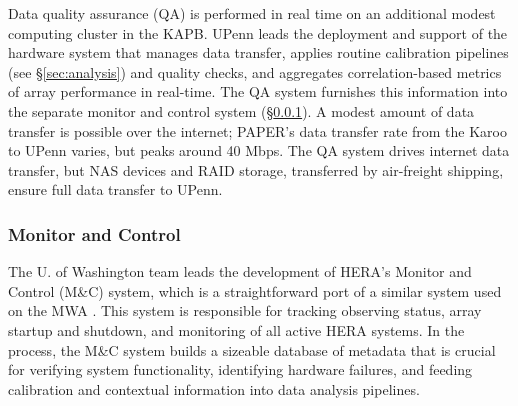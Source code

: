 \documentclass[preprint]{aastex}
\newcommand{\compress}{\vspace{-0.3in}}
\begin{document}
Data quality assurance (QA) is performed in real time on an additional modest 
computing cluster in the
KAPB.  UPenn leads the deployment and support of the hardware system that
manages data transfer, applies routine calibration pipelines (see \S\ref{sec:analysis}) and quality
checks, and aggregates correlation-based metrics of array performance in real-time.  The QA system
furnishes this information into the separate monitor and control system (\S\ref{sec:monitor}).
A modest amount of data transfer is possible over the internet; PAPER's data transfer rate from the Karoo
to UPenn varies, but peaks around 40 Mbps.  The QA system drives internet data transfer, but
NAS devices and RAID storage, transferred by air-freight shipping, ensure full data transfer to UPenn.




\compress
\subsubsection{Monitor and Control}
\label{sec:monitor}

The U. of Washington team leads the development of HERA's Monitor and Control (M\&C) system,
which is a straightforward port of a similar system used on the MWA \citep{tingay_et_al2013}.
This system is
responsible for tracking observing status, array startup and shutdown, and
monitoring of all active HERA systems. In the process, the M\&C system builds a sizeable database of 
metadata that is crucial for verifying system functionality, identifying hardware failures, and feeding
calibration and contextual information into data analysis pipelines.  
\end{document}
